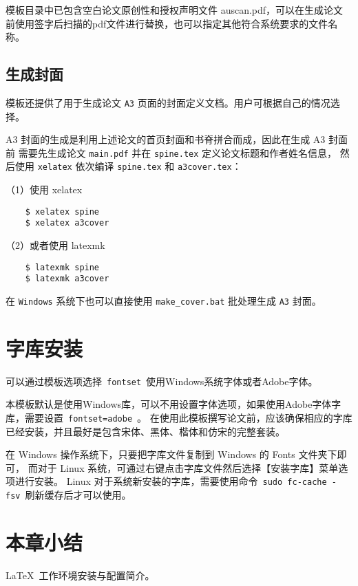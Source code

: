 模板目录中已包含空白论文原创性和授权声明文件 auscan.pdf，可以在生成论文前使用签字后扫描的pdf文件进行替换，也可以指定其他符合系统要求的文件名称。

\subsection{生成封面}
\label{sec:generate-cover}

模板还提供了用于生成论文 \texttt{A3} 页面的封面定义文档。用户可根据自己的情况选择。

A3 封面的生成是利用上述论文的首页封面和书脊拼合而成，因此在生成 A3 封面前
需要先生成论文 \texttt{main.pdf} 并在 \texttt{spine.tex} 定义论文标题和作者姓名信息，
然后使用 \texttt{xelatex} 依次编译 \texttt{spine.tex} 和 \texttt{a3cover.tex}：

（1）使用 xelatex

\begin{lstlisting}
    $ xelatex spine
    $ xelatex a3cover
\end{lstlisting}

（2）或者使用 latexmk

\begin{lstlisting}
    $ latexmk spine
    $ latexmk a3cover
\end{lstlisting}

在 \texttt{Windows} 系统下也可以直接使用 \texttt{make\_cover.bat} 批处理生成 \texttt{A3} 封面。

\section{字库安装}

可以通过模板选项选择~\texttt{fontset}~使用Windows系统字体或者Adobe字体。

本模板默认是使用Windows库，可以不用设置字体选项，如果使用Adobe字体字库，需要设置~\texttt{fontset=adobe}~。
在使用此模板撰写论文前，应该确保相应的字库已经安装，并且最好是包含宋体、黑体、楷体和仿宋的完整套装。

在 Windows 操作系统下，只要把字库文件复制到 Windows 的 Fonts 文件夹下即可，
而对于 Linux 系统，可通过右键点击字库文件然后选择【安装字库】菜单选项进行安装。
Linux 对于系统新安装的字库，需要使用命令~\texttt{sudo fc-cache -fsv}~刷新缓存后才可以使用。

\section*{本章小结}
\LaTeX{}~工作环境安装与配置简介。
